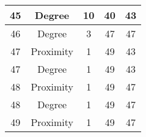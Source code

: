 \documentclass[results.tex]{subfiles}
\begin{document}
\begin{center}
\begin{tabular}{| c || c | c | c | c |}
            \hline
            45                      & Degree                       & 10                     & 40                      & 43                   \\
            \hline
            46                      & Degree                       & 3                      & 47                      & 47                   \\
            \hline
            47                      & Proximity                    & 1                      & 49                      & 43                   \\
            \hline
            47                      & Degree                       & 1                      & 49                      & 43                   \\
            \hline
            48                      & Proximity                    & 1                      & 49                      & 47                   \\
            \hline
            48                      & Degree                       & 1                      & 49                      & 47                   \\
            \hline
            49                      & Proximity                    & 1                      & 49                      & 47                   \\
            \hline
        \end{tabular}
    \end{center}
\end{document}

